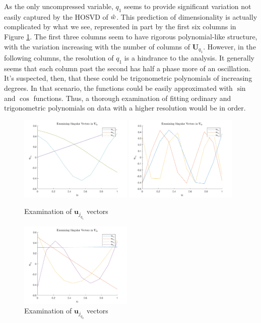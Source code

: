 \documentclass[12pt]{article}
\begin{document}
    As the only uncompressed variable, $q_1$ seems to provide significant variation not easily captured by the HOSVD of $\Hat{w}$. This prediction of dimensionality is actually complicated by what we see, represented in part by the first six columns in Figure \ref{fig:burgers_uq1}. The first three columns seem to have rigorous polynomial-like structure, with the variation increasing with the number of columns of $\mathbf{U}_{q_1}$. However, in the following columns, the resolution of $q_1$ is a hindrance to the analysis. It generally seems that each column past the second has half a phase more of an oscillation. It's suspected, then, that these could be trigonometric polynomials of increasing degrees. In that scenario, the functions could be easily approximated with $\sin$ and $\cos$ functions. Thus, a thorough examination of fitting ordinary and trigonometric polynomials on data with a higher resolution would be in order.
    \begin{figure}[t]
        \centering
        \includegraphics[width=0.48\textwidth]{figures/burgers_uq1_1_3.pdf}
        \includegraphics[width=0.48\textwidth]{figures/burgers_uq1_4_6.pdf}
        \caption{Examination of $\mathbf{u}_{j_{q_1}}$ vectors}
        \label{fig:burgers_uq1}
    \end{figure}
    \begin{figure}[t]
        \centering
        \includegraphics[width=0.48\textwidth]{figures/burgers_uq2_1_4.pdf}
        \caption{Examination of $\mathbf{u}_{j_{q_2}}$ vectors}
        \label{fig:burgers_uq2}
    \end{figure}
\end{document}
